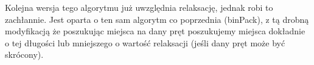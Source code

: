Kolejna wersja tego algorytmu już uwzględnia relaksację, jednak robi to zachłannie. Jest oparta o ten sam algorytm co poprzednia (binPack), z tą drobną modyfikacją że poszukując miejsca na dany pręt poszukujemy miejsca dokładnie o tej długości lub mniejszego o wartość relaksacji (jeśli dany pręt może być skrócony).









